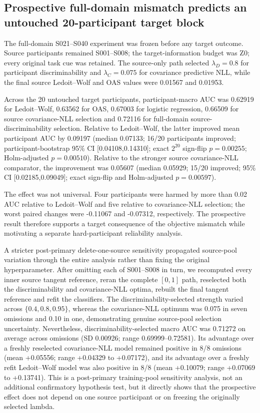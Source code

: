 \subsection{Prospective full-domain mismatch predicts an untouched 20-participant target block}
The full-domain S021--S040 experiment was frozen before any target outcome.
Source participants remained S001--S008; the target-information budget was
Z0; every original task cue was retained. The source-only path selected
\(\lambda_D=0.8\) for participant discriminability and \(\lambda_C=0.075\)
for covariance predictive NLL, while the final source Ledoit--Wolf and OAS
values were 0.01567 and 0.01953.

Across the 20 untouched target participants, participant-macro AUC was
0.62919 for Ledoit--Wolf, 0.63562 for OAS, 0.67003 for logistic regression,
0.66509 for source covariance-NLL selection and 0.72116 for full-domain
source-discriminability selection. Relative to Ledoit--Wolf, the latter
improved mean participant AUC by 0.09197 (median 0.07133; 16/20 participants
improved; participant-bootstrap 95\% CI [0.04108,0.14310]; exact
\(2^{20}\) sign-flip \(p=0.00255\); Holm-adjusted \(p=0.00510\)).
Relative to the stronger source covariance-NLL comparator, the improvement
was 0.05607 (median 0.05929; 15/20 improved; 95\% CI
[0.02185,0.09049]; exact sign-flip and Holm-adjusted \(p=0.00597\)).

The effect was not universal. Four participants were harmed by more than
0.02 AUC relative to Ledoit--Wolf and five relative to covariance-NLL
selection; the worst paired changes were -0.11067 and -0.07312,
respectively. The prospective result therefore supports a target consequence
of the objective mismatch while motivating a separate hard-participant
reliability analysis.

A stricter post-primary delete-one-source sensitivity propagated source-pool
variation through the entire analysis rather than fixing the original
hyperparameter. After omitting each of S001--S008 in turn, we recomputed every
inner source tangent reference, reran the complete \([0,1]\) path, reselected
both the discriminability and covariance-NLL optima, rebuilt the final tangent
reference and refit the classifiers. The discriminability-selected strength
varied across \(\{0.4,0.8,0.95\}\), whereas the covariance-NLL optimum was
0.075 in seven omissions and 0.10 in one, demonstrating genuine source-pool
selection uncertainty. Nevertheless, discriminability-selected macro AUC was
0.71272 on average across omissions (SD 0.00926; range
0.69999--0.72581). Its advantage over a freshly reselected covariance-NLL
model remained positive in 8/8 omissions (mean +0.05556; range
+0.04329 to +0.07172), and its advantage over a freshly refit Ledoit--Wolf
model was also positive in 8/8 (mean +0.10079; range +0.07069 to +0.13741).
This is a post-primary training-pool sensitivity analysis, not an additional
confirmatory hypothesis test, but it directly shows that the prospective
effect does not depend on one source participant or on freezing the originally
selected lambda.

